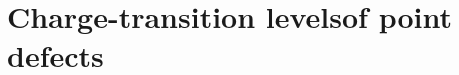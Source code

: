 \cleardoublepage
\chapter[Charge-transition levels of point defects]{Charge-transition levels\break of point defects\label{ch:defects}}

